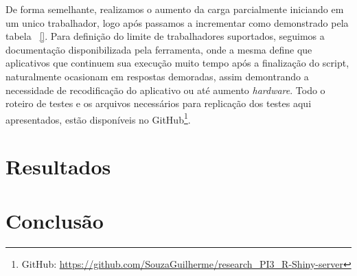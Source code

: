 \documentclass[12pt,english,brazil]{article}
\begin{document}
De forma semelhante, realizamos o aumento da carga parcialmente iniciando em um unico trabalhador, logo após passamos a incrementar como demonstrado pela tabela ~\ref{}. Para definição do limite de trabalhadores suportados, seguimos a documentação disponibilizada pela ferramenta, onde a mesma define que aplicativos que continuem sua execução muito tempo após a finalização do script, naturalmente ocasionam em respostas demoradas, assim demontrando a necessidade de recodificação do aplicativo ou até aumento \emph{hardware}. Todo o roteiro de testes e os arquivos necessários para replicação dos testes aqui apresentados, estão disponíveis no GitHub\footnote{GitHub: \url{https://github.com/SouzaGuilherme/research_PI3_R-Shiny-server}}.

\section{Resultados} \label{sec:Resultados}


\section{Conclusão} \label{sec:conlusao}





\end{document}
